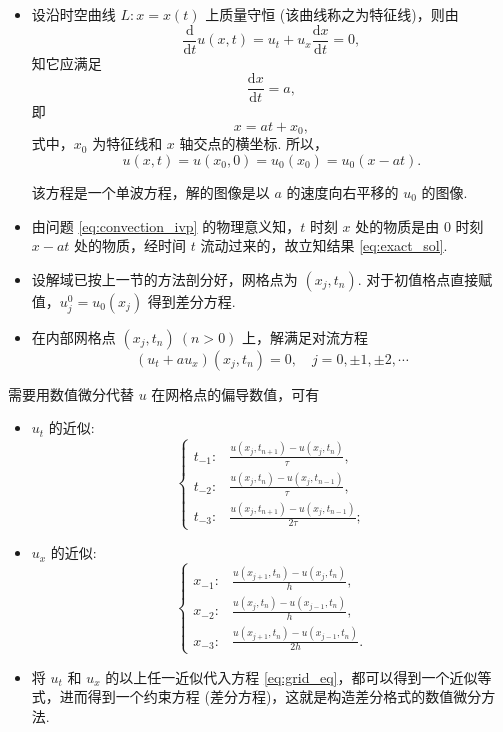  \par
\begin{itemize}
    \item {} 设沿时空曲线 $L: x = x(t)$ 上质量守恒 (该曲线称之为特征线)，则由
    \[ \frac{\mathrm{d}}{\mathrm{d}t} u(x, t) = u_t + u_x \frac{\mathrm{d}x}{\mathrm{d}t} = 0, \]
    知它应满足
    \[ \frac{\mathrm{d}x}{\mathrm{d}t} = a, \]
    即
    \[ x = at + x_0, \]
    式中，$x_0$ 为特征线和 $x$ 轴交点的横坐标. 所以，
    \begin{equation}
        u(x, t) = u(x_0, 0) = u_0(x_0) = u_0(x - at). \label{eq:exact_sol}
    \end{equation}
    
    该方程是一个单波方程，解的图像是以 $a$ 的速度向右平移的 $u_0$ 的图像. 
    
    \item {} 由问题 \eqref{eq:convection_ivp} 的物理意义知，$t$ 时刻 $x$ 处的物质是由 $0$ 时刻 $x-at$ 处的物质，经时间 $t$ 流动过来的，故立知结果 \eqref{eq:exact_sol}.
\end{itemize}

 \par
\begin{itemize}
    \item 设解域已按上一节的方法剖分好，网格点为 $(x_j, t_n)$. 对于初值格点直接赋值，$u^0_j=u_0(x_j)$ 得到差分方程.
    \item 在内部网格点 $(x_j, t_n) \ (n > 0)$ 上，解满足对流方程
    \begin{equation}
        (u_t + a u_x)(x_j, t_n) = 0, \quad j = 0, \pm 1, \pm 2, \cdots \label{eq:grid_eq}
    \end{equation}
\end{itemize}

需要用数值微分代替 $u$ 在网格点的偏导数值，可有
\begin{itemize}
    \item $u_t$ 的近似:
    \[ \begin{cases} 
    t_{-1}: & \frac{u(x_j, t_{n+1}) - u(x_j, t_n)}{\tau}, \\[6pt]
    t_{-2}: & \frac{u(x_j, t_n) - u(x_j, t_{n-1})}{\tau}, \\[6pt]
    t_{-3}: & \frac{u(x_j, t_{n+1}) - u(x_j, t_{n-1})}{2\tau};
    \end{cases} \]
    
    \item $u_x$ 的近似:
    \[ \begin{cases} 
    x_{-1}: & \frac{u(x_{j+1}, t_n) - u(x_j, t_n)}{h}, \\[6pt]
    x_{-2}: & \frac{u(x_j, t_n) - u(x_{j-1}, t_n)}{h}, \\[6pt]
    x_{-3}: & \frac{u(x_{j+1}, t_n) - u(x_{j-1}, t_n)}{2h}.
    \end{cases} \]
    
    \item 将 $u_t$ 和 $u_x$ 的以上任一近似代入方程 \eqref{eq:grid_eq}，都可以得到一个近似等式，进而得到一个约束方程 (差分方程)，这就是构造差分格式的数值微分方法.
\end{itemize}

